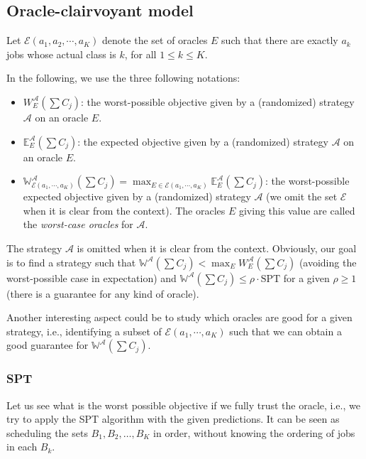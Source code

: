 \documentclass{article}
\begin{document}
\subsection{Oracle-clairvoyant model}

Let \(\mathcal{E}(a_1,a_2,\cdots,a_K)\) denote the set of oracles \(E\) such that there are exactly \(a_k\) jobs whose actual class is \(k\), for all \(1\le k\le K\).

In the following, we use the three following notations:
\begin{itemize}
    \item \(W^{\mathcal{A}}_E\left(\sum C_j\right)\): the worst-possible objective given by a (randomized) strategy \(\mathcal{A}\) on an oracle \(E\).
    \item \(\mathbb{E}^{\mathcal{A}}_E\left(\sum C_j\right)\): the expected objective given by a (randomized) strategy \(\mathcal{A}\) on an oracle \(E\).
    \item \(\mathbb{W}^{\mathcal{A}}_{\mathcal{E}(a_1,\cdots,a_K)}\left(\sum C_j\right)=\max_{E\in\mathcal{E}(a_1,\cdots,a_K)} \mathbb{E}^{\mathcal{A}}_E\left(\sum C_j\right)\): the worst-possible expected objective given by a (randomized) strategy \(\mathcal{A}\) (we omit the set \(\mathcal{E}\) when it is clear from the context).
    The oracles \(E\) giving this value are called the \emph{worst-case oracles} for \(\mathcal{A}\).
\end{itemize}
The strategy \(\mathcal{A}\) is omitted when it is clear from the context.
Obviously, our goal is to find a strategy such that \(\mathbb{W}^{\mathcal{A}}\left(\sum C_j\right)<\max_E W^{\mathcal{A}}_E\left(\sum C_j\right)\) (avoiding the worst-possible case in expectation) and \(\mathbb{W}^{\mathcal{A}}\left(\sum C_j\right)\le\rho\cdot\text{SPT}\) for a given \(\rho\ge 1\) (there is a guarantee for any kind of oracle).

Another interesting aspect could be to study which oracles are good for a given strategy, i.e., identifying a subset of \(\mathcal{E}(a_1,\cdots,a_K)\) such that we can obtain a good guarantee for \(\mathbb{W}^{\mathcal{A}}\left(\sum C_j\right)\).

\subsubsection{SPT}

Let us see what is the worst possible objective if we fully trust the oracle, i.e., we try to apply the SPT algorithm with the given predictions.
It can be seen as scheduling the sets \(B_1,B_2,\dots,B_K\) in order, without knowing the ordering of jobs in each \(B_k\).
\end{document}
